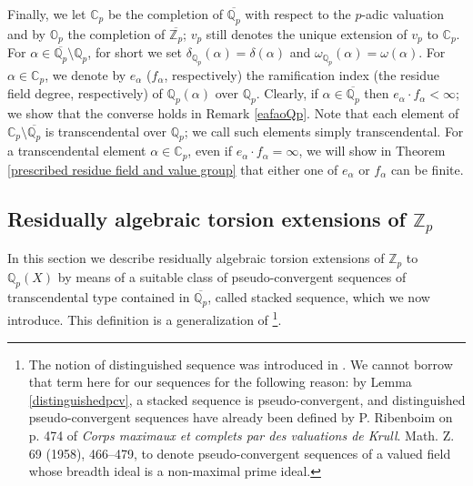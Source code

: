 \documentclass[10pt]{article}
\numberwithin{equation}{section}
\theoremstyle{definition}\newtheorem{Def}[equation]{Definition}
\theoremstyle{definition}\newtheorem{Ques}[equation]{Question}
\newcommand{\Q}{\mathbb{Q}}
\newcommand{\Z}{\mathbb{Z}}
\renewcommand{\O}{\mathbb{O}}
\newcommand{\C}{\mathbb{C}}
\newcommand{\oQp}{\overline{\Q_p}}
\newcommand{\oZp}{\overline{\Z_p}}
\begin{document}
Finally, we let $\C_p$ be the completion of $\oQp$ with respect to the $p$-adic valuation and by $\O_p$ the completion of $\oZp$; $v_p$ still denotes the unique extension of $v_p$ to $\C_p$. For $\alpha\in\oQp\setminus\Q_p$, for short we set $\delta_{\Q_p}(\alpha)=\delta(\alpha)$ and $\omega_{\Q_p}(\alpha)=\omega(\alpha)$. For $\alpha\in\C_p$, we denote by $e_{\alpha}$ ($f_{\alpha}$, respectively) the ramification index (the residue field degree, respectively) of $\Q_p(\alpha)$ over $\Q_p$. Clearly, if $\alpha\in\oQp$ then $e_{\alpha}\cdot f_{\alpha}<\infty$; we show that the converse holds in Remark \ref{eafaoQp}. Note that each element of $\C_p\setminus\oQp$ is transcendental over $\Q_p$; we call such elements simply transcendental. For a transcendental element $\alpha\in\C_p$, even if $e_{\alpha}\cdot f_{\alpha}=\infty$, we will show in Theorem \ref{prescribed residue field and value group} that either one of $e_{\alpha}$ or $f_{\alpha}$ can be finite.  



\subsection{Residually algebraic torsion extensions of $\Z_p$}\label{stackedseq}

In this section we describe residually algebraic torsion extensions of $\Z_p$ to $\Q_p(X)$ by means of a suitable class of pseudo-convergent sequences of transcendental type contained in $\oQp$, called stacked sequence, which we now introduce. This definition is a generalization of \cite[p. 135]{APZclosed}\footnote{The notion of distinguished sequence was introduced in \cite{APZclosed}. We cannot borrow that term here for our sequences for the following reason: by Lemma \ref{distinguishedpcv}, a stacked sequence is pseudo-convergent, and distinguished pseudo-convergent sequences have already been defined by P. Ribenboim on p. 474 of   \emph{Corps maximaux et complets par des valuations de Krull}. Math. Z. 69 (1958), 466–479, to denote pseudo-convergent sequences of a valued field whose breadth ideal is a non-maximal prime ideal.}.
\end{document}
